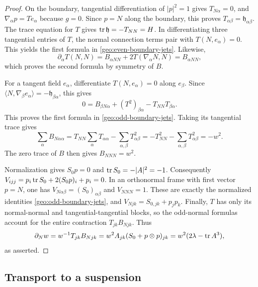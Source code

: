 \begin{proof}
On the boundary, tangential differentiation of $|p|^2=1$ gives
$T_{N\alpha}=0$, and $\nabla_\alpha p=T e_\alpha$ because $g=0$.
Since $p=N$ along the boundary, this proves
$T_{\alpha\beta}=\mathfrak h_{\alpha\beta}$.
The trace equation for $T$ gives $\operatorname{tr}\mathfrak h=-T_{NN}=H$.
In differentiating three tangential entries of $T$, the normal
connection terms pair with $T(N,e_\alpha)=0$. This yields the first
formula in \eqref{geo:even-boundary-jets}.
Likewise,
\[
 \partial_\alpha T(N,N)
 =B_{\alpha NN}+2T(\nabla_\alpha N,N)=B_{\alpha NN},
\]
which proves the second formula by symmetry of $B$.

For a tangent field $e_\alpha$, differentiate $T(N,e_\alpha)=0$
along $e_\beta$. Since
$\langle N,\nabla_\beta e_\alpha\rangle
=-\mathfrak h_{\beta\alpha}$, this gives
\[
 0=B_{\beta N\alpha}+(T^2)_{\beta\alpha}
     -T_{NN}T_{\beta\alpha}.
\]
This proves the first formula in \eqref{geo:odd-boundary-jets}.
Taking its tangential trace gives
\[
 \sum_\alpha B_{N\alpha\alpha}
 =T_{NN}\sum_\alpha T_{\alpha\alpha}
    -\sum_{\alpha,\beta}T_{\alpha\beta}^2
 =-T_{NN}^2-\sum_{\alpha,\beta}T_{\alpha\beta}^2=-w^2.
\]
The zero trace of $B$ then gives $B_{NNN}=w^2$.

Normalization gives $S_0p=0$ and $\operatorname{tr} S_0=-|A|^2=-1$.
Consequently $V_{ijj}=p_i\operatorname{tr} S_0+2(S_0p)_i+p_i=0$.
In an orthonormal frame with first vector $p=N$, one has
$V_{N\alpha\beta}=(S_0)_{\alpha\beta}$ and $V_{NNN}=1$.
These are exactly the normalized identities
\eqref{geo:odd-boundary-jets}, and $V_{Njk}=S_{0,jk}+p_jp_k$.
Finally, $T$ has only its normal-normal and tangential-tangential
blocks, so the odd-normal formulas account for the entire contraction
$T_{jk}B_{Njk}$. Thus
\[
 \partial_Nw=w^{-1}T_{jk}B_{Njk}
 =w^2 A_{jk}(S_0+p\otimes p)_{jk}
 =w^2(2\lambda-\operatorname{tr} A^3),
\]
as asserted.
\end{proof}

\subsection{Transport to a suspension}

